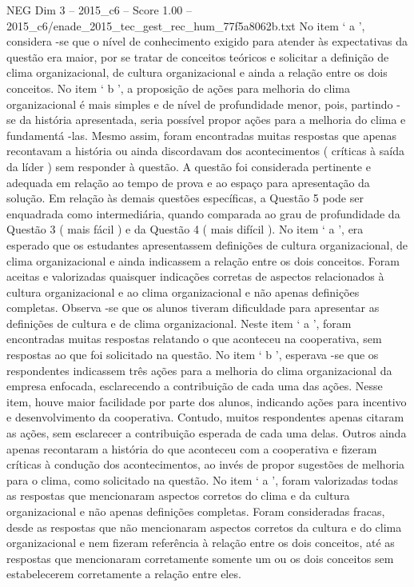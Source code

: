 \begin{textsample}{NEG Dim 3 – 2015\_c6 – Score 1.00 – 2015\_c6/enade\_2015\_tec\_gest\_rec\_hum\_77f5a8062b.txt}
No item ‘ a ’, considera -se que o nível de conhecimento exigido para atender às expectativas da questão era maior, por se tratar de conceitos teóricos e solicitar a definição de clima organizacional, de cultura organizacional e ainda a relação entre os dois conceitos.
No item ‘ b ’, a proposição de ações para melhoria do clima organizacional é mais simples e de nível de profundidade menor, pois, partindo -se da história apresentada, seria possível propor ações para a melhoria do clima e fundamentá -las.
Mesmo assim, foram encontradas muitas respostas que apenas recontavam a história ou ainda discordavam dos acontecimentos ( críticas à saída da líder ) sem responder à questão.
A questão foi considerada pertinente e adequada em relação ao tempo de prova e ao espaço para apresentação da solução.
Em relação às demais questões específicas, a Questão 5 pode ser enquadrada como intermediária, quando comparada ao grau de profundidade da Questão 3 ( mais fácil ) e da Questão 4 ( mais difícil ).
No item ‘ a ’, era esperado que os estudantes apresentassem definições de cultura organizacional, de clima organizacional e ainda indicassem a relação entre os dois conceitos.
Foram aceitas e valorizadas quaisquer indicações corretas de aspectos relacionados à cultura organizacional e ao clima organizacional e não apenas definições completas.
Observa -se que os alunos tiveram dificuldade para apresentar as definições de cultura e de clima organizacional.
Neste item ‘ a ’, foram encontradas muitas respostas relatando o que aconteceu na cooperativa, sem respostas ao que foi solicitado na questão.
No item ‘ b ’, esperava -se que os respondentes indicassem três ações para a melhoria do clima organizacional da empresa enfocada, esclarecendo a contribuição de cada uma das ações.
Nesse item, houve maior facilidade por parte dos alunos, indicando ações para incentivo e desenvolvimento da cooperativa.
Contudo, muitos respondentes apenas citaram as ações, sem esclarecer a contribuição esperada de cada uma delas.
Outros ainda apenas recontaram a história do que aconteceu com a cooperativa e fizeram críticas à condução dos acontecimentos, ao invés de propor sugestões de melhoria para o clima, como solicitado na questão.
No item ‘ a ’, foram valorizadas todas as respostas que mencionaram aspectos corretos do clima e da cultura organizacional e não apenas definições completas.
Foram consideradas fracas, desde as respostas que não mencionaram aspectos corretos da cultura e do clima organizacional e nem fizeram referência à relação entre os dois conceitos, até as respostas que mencionaram corretamente somente um ou os dois conceitos sem estabelecerem corretamente a relação entre eles.

\end{textsample}
